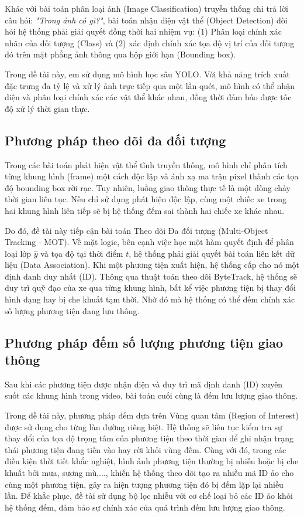 Khác với bài toán phân loại ảnh (Image Classification) truyền thống chỉ trả lời câu hỏi: \textit{"Trong ảnh có gì?"}, bài toán nhận diện vật thể (Object Detection) đòi hỏi hệ thống phải giải quyết đồng thời hai nhiệm vụ: (1) Phân loại chính xác nhãn của đối tượng (Class) và (2) xác định chính xác tọa độ vị trí của đối tượng đó trên mặt phẳng ảnh thông qua hộp giới hạn (Bounding box).

Trong đề tài này, em sử dụng mô hình học sâu YOLO. Với khả năng trích xuất đặc trưng đa tỷ lệ và xử lý ảnh trực tiếp qua một lần quét, mô hình có thể nhận diện và phân loại chính xác các vật thể khác nhau, đồng thời đảm bảo được tốc độ xử lý thời gian thực.

\subsection{Phương pháp theo dõi đa đối tượng}

Trong các bài toán phát hiện vật thể tĩnh truyền thống, mô hình chỉ phân tích từng khung hình (frame) một cách độc lập và ánh xạ ma trận pixel thành các tọa độ bounding box rời rạc. Tuy nhiên, luồng giao thông thực tế là một dòng chảy thời gian liên tục. Nếu chỉ sử dụng phát hiện độc lập, cùng một chiếc xe trong hai khung hình liên tiếp sẽ bị hệ thống đếm sai thành hai chiếc xe khác nhau.

Do đó, đề tài này tiếp cận bài toán Theo dõi Đa đối tượng (Multi-Object Tracking - MOT). Về mặt logic, bên cạnh việc học một hàm quyết định để phân loại lớp $\hat{y}$ và tọa độ tại thời điểm $t$, hệ thống phải giải quyết bài toán liên kết dữ liệu (Data Association). Khi một phương tiện xuất hiện, hệ thống cấp cho nó một định danh duy nhất (ID). Thông qua thuật toán theo dõi ByteTrack, hệ thống sẽ duy trì quỹ đạo của xe qua từng khung hình, bất kể việc phương tiện bị thay đổi hình dạng hay bị che khuất tạm thời. Nhờ đó mà hệ thống có thể đếm chính xác số lượng phương tiện đang lưu thông.

\subsection{Phương pháp đếm số lượng phương tiện giao thông}

Sau khi các phương tiện được nhận diện và duy trì mã định danh (ID) xuyên suốt các khung hình trong video, bài toán cuối cùng là đếm lưu lượng giao thông.

Trong đề tài này, phương pháp đếm dựa trên Vùng quan tâm (Region of Interest) được sử dụng cho từng làn đường riêng biệt. Hệ thống sẽ liên tục kiểm tra sự thay đổi của tọa độ trọng tâm của phương tiện theo thời gian để ghi nhận trạng thái phương tiện đang tiến vào hay rời khỏi vùng đếm. Cùng với đó, trong các điều kiện thời tiết khắc nghiệt, hình ảnh phương tiện thường bị nhiễu hoặc bị che khuất bởi mưa, sương mù,..., khiến hệ thống theo dõi tạo ra nhiều mã ID ảo cho cùng một phương tiện, gây ra hiện tượng phương tiện đó bị đếm lặp lại nhiều lần. Để khắc phục, đề tài sử dụng bộ lọc nhiễu với cơ chế loại bỏ các ID ảo khỏi hệ thống đếm, đảm bảo sự chính xác của quá trình đếm lưu lượng giao thông.

